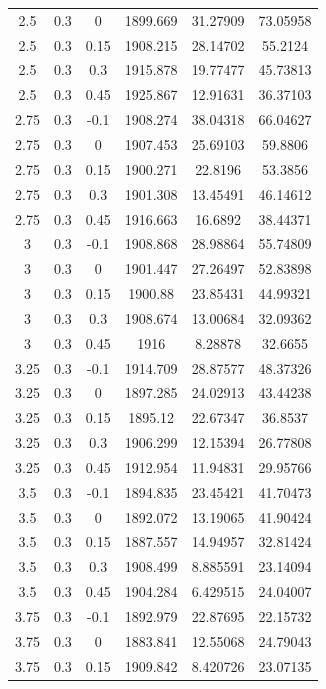 \begin{longtable}{|c|c|c|c|c|c|}
	2.5   & 0.3   & 0     & 1899.669 & 31.27909 & 73.05958 \\
	2.5   & 0.3   & 0.15  & 1908.215 & 28.14702 & 55.2124 \\
	2.5   & 0.3   & 0.3   & 1915.878 & 19.77477 & 45.73813 \\
	2.5   & 0.3   & 0.45  & 1925.867 & 12.91631 & 36.37103 \\
	2.75  & 0.3   & -0.1  & 1908.274 & 38.04318 & 66.04627 \\
	2.75  & 0.3   & 0     & 1907.453 & 25.69103 & 59.8806 \\
	2.75  & 0.3   & 0.15  & 1900.271 & 22.8196 & 53.3856 \\
	2.75  & 0.3   & 0.3   & 1901.308 & 13.45491 & 46.14612 \\
	2.75  & 0.3   & 0.45  & 1916.663 & 16.6892 & 38.44371 \\
	3     & 0.3   & -0.1  & 1908.868 & 28.98864 & 55.74809 \\
	3     & 0.3   & 0     & 1901.447 & 27.26497 & 52.83898 \\
	3     & 0.3   & 0.15  & 1900.88 & 23.85431 & 44.99321 \\
	3     & 0.3   & 0.3   & 1908.674 & 13.00684 & 32.09362 \\
	3     & 0.3   & 0.45  & 1916  & 8.28878 & 32.6655 \\
	3.25  & 0.3   & -0.1  & 1914.709 & 28.87577 & 48.37326 \\
	3.25  & 0.3   & 0     & 1897.285 & 24.02913 & 43.44238 \\
	3.25  & 0.3   & 0.15  & 1895.12 & 22.67347 & 36.8537 \\
	3.25  & 0.3   & 0.3   & 1906.299 & 12.15394 & 26.77808 \\
	3.25  & 0.3   & 0.45  & 1912.954 & 11.94831 & 29.95766 \\
	3.5   & 0.3   & -0.1  & 1894.835 & 23.45421 & 41.70473 \\
	3.5   & 0.3   & 0     & 1892.072 & 13.19065 & 41.90424 \\
	3.5   & 0.3   & 0.15  & 1887.557 & 14.94957 & 32.81424 \\
	3.5   & 0.3   & 0.3   & 1908.499 & 8.885591 & 23.14094 \\
	3.5   & 0.3   & 0.45  & 1904.284 & 6.429515 & 24.04007 \\
	3.75  & 0.3   & -0.1  & 1892.979 & 22.87695 & 22.15732 \\
	3.75  & 0.3   & 0     & 1883.841 & 12.55068 & 24.79043 \\
	3.75  & 0.3   & 0.15  & 1909.842 & 8.420726 & 23.07135 \\

\end{longtable}
